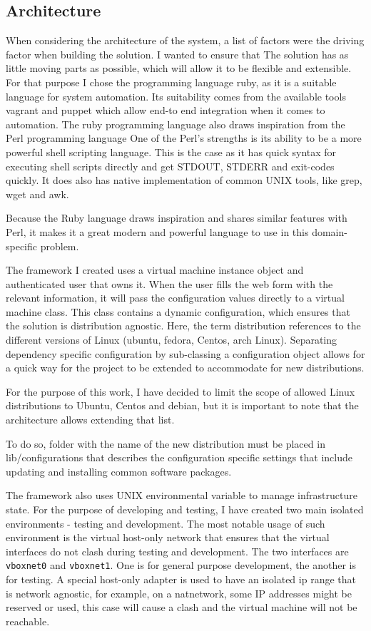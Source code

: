 \documentclass{article}
\begin{document}
\subsection{Architecture}
When considering the architecture of the system, a list of factors were the driving factor when building the solution. I wanted to ensure that The solution has as little moving parts as possible, which will allow it to be flexible and extensible. For that purpose I chose the programming language ruby, as it is a suitable language for system automation. Its suitability comes from the available tools vagrant and puppet which allow end-to end integration when it comes to automation. The ruby programming language also draws inspiration from the Perl programming language One of the Perl's strengths is its ability to be a more powerful shell scripting language. This is the case as it has quick syntax for executing shell scripts directly and get STDOUT, STDERR and exit-codes quickly. It does also has native implementation of common UNIX tools, like grep, wget and awk.

Because the Ruby language draws inspiration and shares similar features with Perl, it makes it a great modern and powerful language to use in this domain-specific problem.

The framework I created uses a virtual machine instance object and authenticated user that owns it. When the user fills the web form with the relevant information, it will pass the configuration values directly to a virtual machine class. This class contains a dynamic configuration, which ensures that the solution is distribution agnostic. Here, the term distribution references to the different versions of Linux (ubuntu, fedora, Centos, arch Linux). Separating dependency specific configuration by sub-classing a configuration object allows for a quick way for the project to be extended to accommodate for new distributions. 

For the purpose of this work, I have decided to limit the scope of allowed Linux distributions to Ubuntu, Centos and debian, but it is important to note that the architecture allows extending that list.

To do so, folder with the name of the new distribution must be placed in lib/configurations that describes the configuration specific settings that include updating and installing common software packages.

The framework also uses UNIX environmental variable to manage infrastructure state. For the  purpose of developing and testing, I have created two main isolated environments - testing and development.
The most notable usage of such environment is the virtual host-only network that ensures that the virtual interfaces do not clash during testing and development. The two interfaces are \texttt{vboxnet0} and \texttt{vboxnet1}. One is for general purpose development, the another is for testing. A special host-only adapter is used to have an isolated ip range that is network agnostic, for example, on a \gls{natnetwork}, some IP addresses might be reserved or used, this case will cause a clash and the virtual machine will not be reachable.
\end{document}
